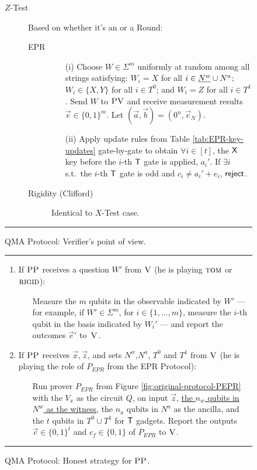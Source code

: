 \documentclass[11pt]{article}
\theoremstyle{remark}
\theoremstyle{definition}
\newcommand{\rigid}{\textsc{rigid}}
\newcommand{\tom}{\textsc{tom}}
\newcommand{\ver}{\textsc{V}}
\newcommand{\pv}{\textsc{PV}}
\newcommand{\pp}{\textsc{PP}}
\newcommand{\highlight}[1]{\uline{#1}}
\begin{document}
\begin{figure}[H]
\begin{description}
\item[$Z$-Test] Based on whether it's an  or a  Round:
\begin{description}
	\item[EPR] 
	\begin{enumerate}
		\item[(i)] Choose $W\in\Sigma^m$ uniformly at random among all strings
      satisfying: $W_i=X$ for all $i\in \highlight{N^w} \cup N^a$; $W_i\in\{X,Y\}$ for all $i\in T^0$; and $W_i=Z$ for all $i\in T^1$. Send $W$ to $\pv$ and receive measurement results $\vec{e}\in\{0,1\}^m$. Let $(\vec{a},\vec{b})=(0^n,\vec{e}_N)$.
		\item[(ii)] Apply update rules from Table \ref{tab:EPR-key-updates} gate-by-gate to obtain $\forall i\in [t]$, the $\sf X$ key before the $i$-th $\sf T$ gate is applied, $a_i'$. 
If $\exists i$ s.t.\ the $i$-th $\sf T$ gate is odd and $c_i\neq a_i'+e_i$, $\sf reject$. 
	\end{enumerate}
	\item[Rigidity (Clifford)] Identical to $X$-Test case.
\end{description}
\end{description}
\rule[2ex]{16.5cm}{0.5pt}\vspace{-.5cm}
\caption{QMA Protocol: Verifier's point of view.}\label{fig:qma-protocol-V}
\end{figure}


\begin{figure}[H]
\rule[1ex]{16.5cm}{0.5pt}
\vspace{-20pt}
\begin{enumerate}
  \item If $\pp$ receives a question ${W}'$ from $\ver$ (he is playing $\tom$ or $\rigid$):
\begin{enumerate}
     \item[]  Measure the $m$ qubits in the observable indicated by $W'$ --- for example, if $W'\in\Sigma^m$, for $i\in \{1,\ldots,m\}$, measure the $i$-th qubit in the basis indicated by $W_i'$ --- and report
       the outcomes $\vec{e}'$ to~$\ver$.
\end{enumerate}
\item If $\pp$ receives $\vec{x}, \vec{z}$, and sets $N^w$,$N^a$, $T^0$ and $T^1$ from $\ver$ (he is playing the role of $P_{EPR}$ from the EPR Protocol):
\begin{enumerate}
     \item[] Run  prover $P_{EPR}$ from Figure
       \ref{fig:original-protocol-PEPR} with the $V_x$ as the circuit $Q$, on input $\vec{z}$, \highlight{the $n_w$ qubits in $N^w$ as the witness}, the $n_a$ qubits in 
        $N^a$ as the ancilla, and the $t$ qubits in $T^0\cup T^1$ for $\sf T$ gadgets.
     Report the outputs $\vec{c}\in\{0,1\}^t$ and $c_f\in\{0,1\}$ of $P_{EPR}$  to $\ver$. 
\end{enumerate}
\end{enumerate}
\rule[2ex]{16.5cm}{0.5pt}\vspace{-.5cm}
\caption{QMA Protocol: Honest strategy for $\pp$.}\label{fig:qma-protocol-PP}
\end{figure}
\end{document}
